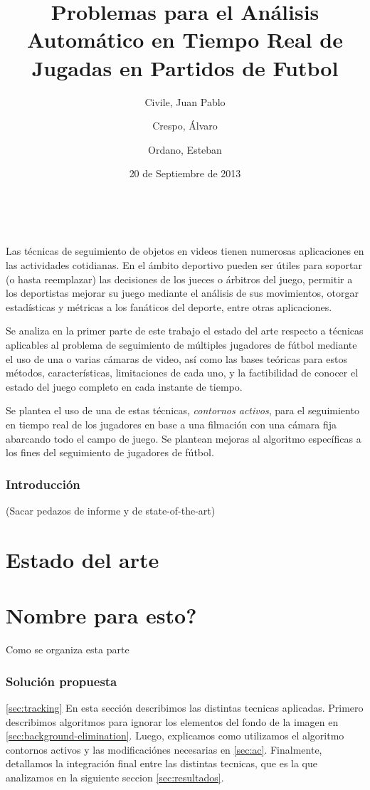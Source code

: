 \documentclass[a4paper,10pt]{article}
\title{Problemas para el Análisis Automático en Tiempo Real de Jugadas en Partidos de Futbol}
\date{20 de Septiembre de 2013}
\author{Civile, Juan Pablo \and Crespo, Álvaro \and Ordano, Esteban }
\def\customabstract{\vspace{.5em}
    {\small\center{\textbf{RESUMEN}} \\[0.5em] \relax%
    }}
\begin{document}
\customabstract{
Las técnicas de seguimiento de objetos en videos tienen numerosas aplicaciones
en las actividades cotidianas. En el ámbito deportivo pueden ser útiles para
soportar (o hasta reemplazar) las decisiones de los jueces o árbitros del
juego, permitir a los deportistas mejorar su juego mediante el análisis de sus
movimientos, otorgar estadísticas y métricas a los fanáticos del deporte, entre
otras aplicaciones.

Se analiza en la primer parte de este trabajo el estado del arte respecto a
técnicas aplicables al problema de seguimiento de múltiples jugadores de fútbol
mediante el uso de una o varias cámaras de video, así como las bases teóricas
para estos métodos, características, limitaciones de cada uno, y la
factibilidad de conocer el estado del juego completo en cada instante de
tiempo.

Se plantea el uso de una de estas técnicas, \textit{contornos activos}, para
el seguimiento en tiempo real de los jugadores en base a una filmación
con una cámara fija abarcando todo el campo de juego. Se plantean mejoras
al algoritmo específicas a los fines del seguimiento de jugadores de fútbol.
}

\section{Introducción}

(Sacar pedazos de informe y de state-of-the-art)

\newpage

\part{Estado del arte}



\newpage

\part{Nombre para esto?}

Como se organiza esta parte



\section{Solución propuesta}

\ref{sec:tracking}
En esta sección describimos las distintas tecnicas aplicadas. Primero describimos algoritmos para
ignorar los elementos del fondo de la imagen en \ref{sec:background-elimination}. Luego, explicamos
como utilizamos el algoritmo contornos activos\cite{fast-level-set} y las modificaciónes necesarias
en \ref{sec:ac}. Finalmente, detallamos la integración final entre las distintas tecnicas, que es
la que analizamos en la siguiente seccion \ref{sec:resultados}.
\end{document}
